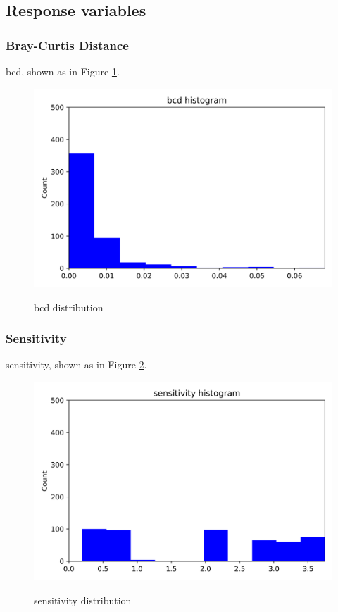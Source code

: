 \documentclass{article}
\begin{document}
\subsection{Response variables}



\subsubsection{Bray-Curtis Distance}

bcd, shown as in Figure \ref{bcd-communitylevel}. \par
\begin{figure}[H]
	\centering
	\includegraphics[width=\textwidth, keepaspectratio]{bcd-communitylevel.png}\\
	\caption{bcd distribution}
	\label{bcd-communitylevel}
\end{figure}

\subsubsection{Sensitivity}
sensitivity, shown as in Figure \ref{sensitivity-communitylevel}. \par
\begin{figure}[H]
	\centering
	\includegraphics[width=\textwidth, keepaspectratio]{sensitivity-communitylevel.png}\\
	\caption{sensitivity distribution}
	\label{sensitivity-communitylevel}
\end{figure}
\end{document}
